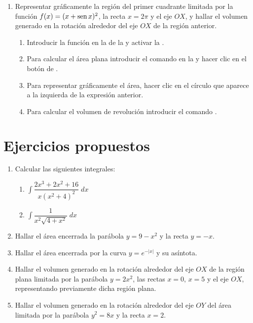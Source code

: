 \begin{enumerate}[leftmargin=*]
\item Representar gráficamente la región del primer cuadrante limitada por la función $f(x)=(x+\operatorname{sen} x)^2$, la recta $x=2\pi$ y el eje $OX$, y hallar el volumen generado en la rotación alrededor del eje $OX$ de la región anterior.
      \begin{indication}
      \begin{enumerate}
      \item Introducir la función  en la  de la  y activar la .
      \item Para calcular el área plana introducir el comando  en la  y hacer clic en el botón de .
      \item Para representar gráficamente el área, hacer clic en el círculo que aparece a la izquierda de la expresión anterior.
      \item Para calcular el volumen de revolución introducir el comando .
      \end{enumerate}
      \end{indication}

\end{enumerate}


\section{Ejercicios propuestos}
\begin{enumerate}[leftmargin=*]
\item Calcular las siguientes integrales:
      \begin{enumerate}
      \item $ \int{\dfrac{2x^{3}+2x^{2}+16}{x(x^{2}+4)^{2}}\;dx}$
      \item $ \int{\dfrac{1}{x^{2}\sqrt{4+x^{2}}}\;dx}$
      \end{enumerate}

\item Hallar el área encerrada la parábola $y=9-x^{2}$ y la recta $y=-x$.

\item Hallar el área encerrada por la curva $y=e^{-|x|}$ y su asíntota.

\item Hallar el volumen generado en la rotación alrededor del eje $OX$ de la región plana limitada por la parábola $y=2x^{2}$, las rectas
      $x=0$, $x=5$ y el eje $OX$, representando previamente dicha región plana.

\item Hallar el volumen generado en la rotación alrededor del eje $OY$ del área limitada por la parábola $y^{2}=8x$ y la recta $x=2$.

\end{enumerate}
